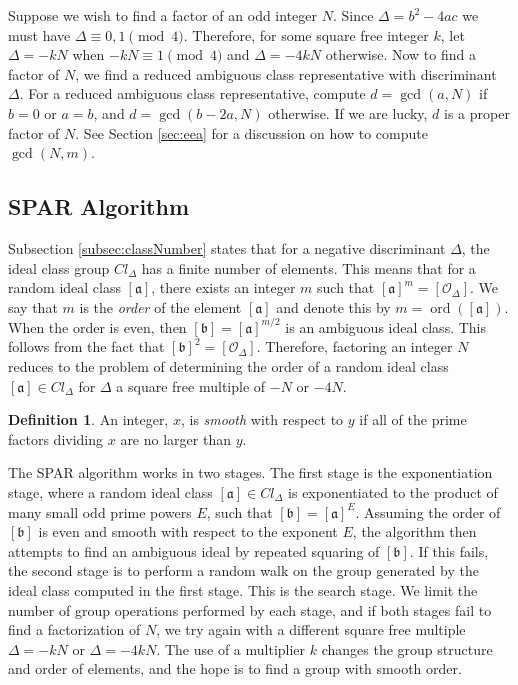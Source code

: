 \documentclass{ucalgthes1}
\theoremstyle{definition}
\newtheorem{defn}[thm]{Definition}
\DeclareMathOperator{\ord}{ord}
\newcommand{\ideal}{\mathfrak}
\newcommand{\idealclass}[1]{\left[ \ideal #1 \right]}
\newcommand{\aclass}{\idealclass a}
\newcommand{\bclass}{\idealclass b}
\newcommand{\idclass}{[\mathcal O_\Delta]}
\begin{document}
Suppose we wish to find a factor of an odd integer $N$. Since $\Delta = b^2 - 4ac$ we must have $\Delta \equiv 0, 1 \pmod 4$.  Therefore, for some square free integer $k$, let $\Delta = -kN$ when $-kN \equiv 1 \pmod 4$ and $\Delta = -4kN$ otherwise.  Now to find a factor of $N$, we find a reduced ambiguous class representative with discriminant $\Delta$.  For a reduced ambiguous class representative, compute $d = \gcd(a, N)$ if $b = 0$ or $a = b$, and $d = \gcd(b-2a, N)$ otherwise.  If we are lucky, $d$ is a proper factor of $N$. See Section \ref{sec:eea} for a discussion on how to compute $\gcd(N, m)$.


\subsection{SPAR Algorithm}

Subsection \ref{subsec:classNumber} states that for a negative discriminant $\Delta$, the ideal class group $Cl_\Delta$ has a finite number of elements.  This means that for a random ideal class $\aclass$, there exists an integer $m$ such that $\aclass^m = \idclass$. We say that $m$ is the \emph{order} of the element $\aclass$ and denote this by $m = \ord(\aclass)$.  When the order is even, then $\bclass = \aclass^{m/2}$ is an ambiguous ideal class.  This follows from the fact that $\bclass^2 = \idclass$.  Therefore, factoring an integer $N$ reduces to the problem of determining the order of a random ideal class $\aclass \in Cl_\Delta$ for $\Delta$ a square free multiple of $-N$ or $-4N$.

\begin{defn}
An integer, $x$, is \emph{smooth} with respect to $y$ if all of the prime factors dividing $x$ are no larger than $y$.
\end{defn}

The SPAR algorithm works in two stages. The first stage is the exponentiation stage, where a random ideal class $\aclass \in Cl_\Delta$ is exponentiated to the product of many small odd prime powers $E$, such that $\bclass = \aclass^E$.  Assuming the order of $\bclass$ is even and smooth with respect to the exponent $E$, the algorithm then attempts to find an ambiguous ideal by repeated squaring of $\bclass$.  If this fails, the second stage is to perform a random walk on the group generated by the ideal class computed in the first stage.  This is the search stage.  We limit the number of group operations performed by each stage, and if both stages fail to find a factorization of $N$, we try again with a different square free multiple $\Delta = -kN$ or $\Delta = -4kN$.  The use of a multiplier $k$ changes the group structure and order of elements, and the hope is to find a group with smooth order.
\end{document}
